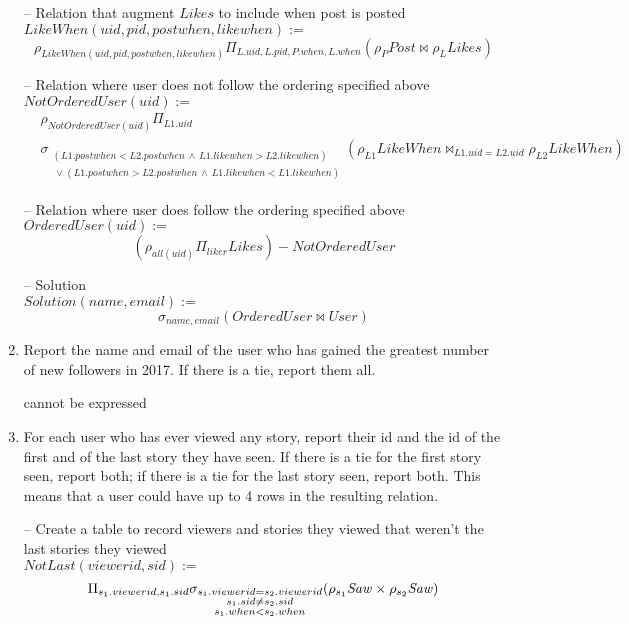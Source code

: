 \documentclass{article}
\newcommand{\var}[1]{\mathit{#1}}
\begin{document}
\begin{enumerate}
{-- Relation that augment $\var{Likes}$ to include when post is posted  \\
$\var{LikeWhen}(uid, pid, postwhen, likewhen) :=$
\[
    \rho_{\var{LikeWhen}(uid, pid, postwhen, likewhen)}
    \Pi_{L.uid, L.pid, P.when, L.when}
    (\rho_{P} \var{Post} \bowtie \rho_{L} \var{Likes}) 
\]


-- Relation where user does not follow the ordering specified above \\
$\var{NotOrderedUser}(uid) :=$
\begin{align*}
    &\rho_{\var{NotOrderedUser}(uid)}
    \Pi_{L1.uid} \\
    &\sigma_{
        \substack{
            (L1.postwhen < L2.postwhen \,\land\, L1.likewhen > L2.likewhen)   \\
            \,\lor (L1.postwhen > L2.postwhen \,\land\, L1.likewhen < L1.likewhen)
        }
    }
    (\rho_{L1} \var{LikeWhen} \bowtie_{L1.uid=L2.uid} \rho_{L2} \var{LikeWhen})
\end{align*}
}

-- Relation where user does follow the ordering specified above \\
$\var{OrderedUser}(uid) :=$
\[
    (\rho_{all(uid)} \Pi_{liker} \var{Likes}) - \var{NotOrderedUser}
\]


-- Solution \\
$\var{Solution}(name, email) := $
\[
    \sigma_{name, email} (\var{OrderedUser} \bowtie \var{User})
\]

\item   %
Report the name and email of the user
who has gained the greatest number of new followers in 2017. 
If there is a tie, report them all.

cannot be expressed

\item   %
For each user who has ever viewed any story, 
    report their id and the id of the first and of the last story they have seen.
If there is a tie for the first story seen, report both;
if there is a tie for the last story seen, report both.
This means that a user could have up to 4 rows in the resulting relation.


\large{
    
    -- Create a table to record viewers and stories they viewed that weren't the last stories they viewed \\
    $\var{NotLast}(viewerid,sid):=$
    \[
        \Pi_{s_1.viewerid,s_1.sid} 
        \sigma_{
            \substack{
                s_1.viewerid = s_2.viewerid \\
                s_1.sid \ne s_2.sid \\
                s_1.when < s_2.when \\
            }
        }\\
        (\rho_{s_1} \var{Saw} \times \rho_{s_2} \var{Saw}) 
    \]
    
}
\end{enumerate}
\end{document}
